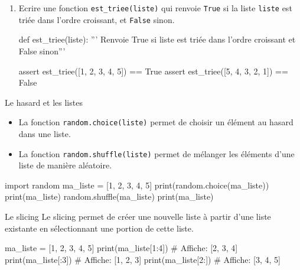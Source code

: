 \begin{exercice_cours}{}
\begin{enumerate}
\begin{CodePythontexAlt}[TaillePolice=\normalsize, Largeur=1\linewidth,Centre,PremLigne=1, Lignes=false,]{}
					#
				assert supprime_element([0, 0, 1, 1, 0, 1, 1, 1]) == [0, 0, 1, 1, 0]
				assert supprime_element([1, 1, 0, 1, 1, 1, 1, 1, 1]) == [1, 1, 0]
				\end{CodePythontexAlt}

\item Ecrire une fonction \texttt{est\_triee(liste)} qui renvoie \texttt{True} si la liste \texttt{liste} est triée dans l'ordre croissant, et \texttt{False} sinon.
					\begin{CodePythontexAlt}[TaillePolice=\normalsize, Largeur=1\linewidth,Centre,PremLigne=1, Lignes=false]{}
def est_triee(liste):
	''' Renvoie True si liste est triée dans l'ordre croissant et False sinon'''









					
					
assert est_triee([1, 2, 3, 4, 5]) == True
assert est_triee([5, 4, 3, 2, 1]) == False
					\end{CodePythontexAlt}
					
	\end{enumerate}
\end{exercice_cours}

\begin{easybox}{Le hasard et les listes}{}
	\begin{itemize}
		\item La fonction \verb|random.choice(liste)| permet de choisir un élément au hasard dans une liste.
		\item La fonction \verb|random.shuffle(liste)| permet de mélanger les éléments d'une liste de manière aléatoire.
	\end{itemize}

\begin{ConsolePythontex}[TaillePolice=\normalsize, Label=false]{}
import random
ma_liste = [1, 2, 3, 4, 5]
print(random.choice(ma_liste))
print(ma_liste)
random.shuffle(ma_liste)
print(ma_liste)
		\end{ConsolePythontex}
\end{easybox}

\begin{easybox}{Le slicing}{}
	Le slicing permet de créer une nouvelle liste à partir d'une liste existante en sélectionnant une portion de cette liste.

	\begin{CodePythontexAlt}[TaillePolice=\normalsize, Largeur=1\linewidth,Centre,PremLigne=1]{}
ma_liste = [1, 2, 3, 4, 5]
print(ma_liste[1:4])
# Affiche: [2, 3, 4]
print(ma_liste[:3])
# Affiche: [1, 2, 3]
print(ma_liste[2:])
# Affiche: [3, 4, 5]
		\end{CodePythontexAlt}
\end{easybox}


